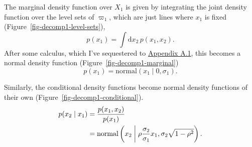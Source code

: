 \documentclass[
  letterpaper,
  DIV=11,
  numbers=noendperiod]{scrartcl}
\begin{document}
The marginal density function over \(X_{1}\) is given by integrating the
joint density function over the level sets of \(\varpi_{1}\), which are
just lines where \(x_{1}\) is fixed
(Figure~\ref{fig-decomp1-level-sets}), \[
p ( x_{1} )
=
\int \mathrm{d} x_{2} \, p( x_{1}, x_{2} ).
\] After some calculus, which I've sequestered to
\hyperref[sec:app1]{Appendix A.1}, this becomes a normal density
function (Figure~\ref{fig-decomp1-marginal}) \[
p ( x_{1} )
=
\text{normal} ( x_{1} \mid 0, \sigma_{1} ).
\]

Similarly, the conditional density functions become normal density
functions of their own (Figure~\ref{fig-decomp1-conditional}).
\begin{align*}
p ( x_{2} \mid x_{1} )
&=
\frac{ p ( x_{1},  x_{2} ) }{ p ( x_{1} ) }
\\
&=
\text{normal} \left(
  x_{2} \biggm|
  \rho \frac{ \sigma_{2} }{ \sigma_{1} } x_{1},
  \sigma_{2} \sqrt{ 1 - \rho^{2} }
\right).
\end{align*}
\end{document}
